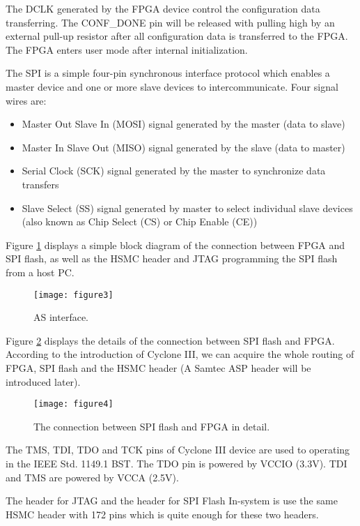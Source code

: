 The DCLK generated by the FPGA device control the configuration data transferring. The CONF\_DONE pin will be released with pulling high by an external pull-up resistor after all configuration data is transferred to the FPGA. The FPGA enters user mode after internal initialization.

The SPI is a simple four-pin synchronous interface protocol which enables a master device and one or more slave devices to intercommunicate. Four signal wires are:
\begin{itemize}
 \item Master Out Slave In (MOSI) signal generated by the master (data to slave)
 \item Master In Slave Out (MISO) signal generated by the slave (data to master)
 \item Serial Clock (SCK) signal generated by the master to synchronize data transfers
 \item Slave Select (SS) signal generated by master to select individual slave devices (also known as Chip Select (CS) or Chip Enable (CE))
\end{itemize}


Figure \ref{fig:b2_f3} displays a simple block diagram of the connection between FPGA and SPI flash, as well as the HSMC header and JTAG programming the SPI flash from a host PC.

\begin{figure}
 \centering
 \texttt{[image: figure3]}
 \caption{AS interface.}
 \label{fig:b2_f3}
\end{figure}


Figure \ref{fig:b2_f4} displays the details of the connection between SPI flash and FPGA. According to the introduction of Cyclone III, we can acquire the whole routing of FPGA, SPI flash and the HSMC header (A Samtec ASP header will be introduced later).

\begin{figure}
 \centering
 \texttt{[image: figure4]}
 \caption{The connection between SPI flash and FPGA in detail.}
 \label{fig:b2_f4}
\end{figure}

The TMS, TDI, TDO and TCK pins of Cyclone III device are used to operating in the IEEE Std. 1149.1 BST. The TDO pin is powered by VCCIO (3.3V). TDI and TMS are powered by VCCA (2.5V).

The header for JTAG and the header for SPI Flash In-system is use the same HSMC header with 172 pins which is quite enough for these two headers.




